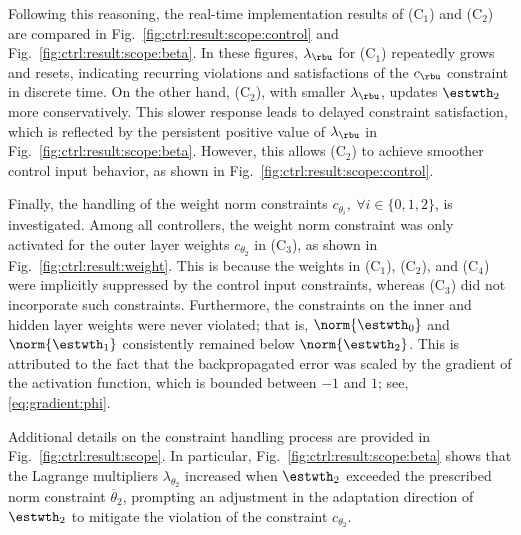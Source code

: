 \documentclass[journal]{IEEEtran}
\begin{document}
Following this reasoning, the real-time implementation results of (C$_1$) and (C$_2$) are compared in Fig.~\ref{fig:ctrl:result:scope:control} and Fig.~\ref{fig:ctrl:result:scope:beta}. 
In these figures, $\lambda_{\rbu}$ for (C$_1$) repeatedly grows and resets, indicating recurring violations and satisfactions of the $c_{\rbu}$ constraint in discrete time.
On the other hand, (C$_2$), with smaller $\lambda_{\rbu}$, updates $\estwth_2$ more conservatively. 
This slower response leads to delayed constraint satisfaction, which is reflected by the persistent positive value of $\lambda_{\rbu}$ in Fig.~\ref{fig:ctrl:result:scope:beta}. 
However, this allows (C$_2$) to achieve smoother control input behavior, as shown in Fig.~\ref{fig:ctrl:result:scope:control}.

\hfill 

Finally, the handling of the weight norm constraints $c_{\theta_i},\ \forall i\in\{0,1,2\}$, is investigated. 
Among all controllers, the weight norm constraint was only activated for the outer layer weights $c_{\theta_2}$ in (C$_3$), as shown in Fig.~\ref{fig:ctrl:result:weight}. 
This is because the weights in (C$_1$), (C$_2$), and (C$_4$) were implicitly suppressed by the control input constraints, whereas (C$_3$) did not incorporate such constraints.
Furthermore, the constraints on the inner and hidden layer weights were never violated; that is, $\norm{\estwth_0}$ and $\norm{\estwth_1}$ consistently remained below $\norm{\estwth_2}$. 
This is attributed to the fact that the backpropagated error was scaled by the gradient of the activation function, which is bounded between $-1$ and $1$; see, \eqref{eq:gradient:phi}.

Additional details on the constraint handling process are provided in Fig.~\ref{fig:ctrl:result:scope}. 
In particular, Fig.~\ref{fig:ctrl:result:scope:beta} shows that the Lagrange multipliers $\lambda_{\theta_2}$ increased when $\estwth_2$ exceeded the prescribed norm constraint $\overline\theta_2$, prompting an adjustment in the adaptation direction of $\estwth_2$ to mitigate the violation of the constraint $c_{\theta_2}$.

\end{document}

